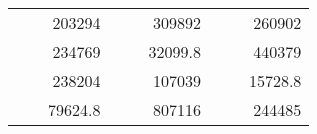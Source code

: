 \begin{table}[]
\begin{tabular}{|ccrccrccc}
\rowcolor[HTML]{DAE8FC} 
\multicolumn{1}{|c|}{\cellcolor[HTML]{FFFFC7}}                                & \multicolumn{1}{c|}{\cellcolor[HTML]{DAE8FC}}                      & \multicolumn{1}{r|}{\cellcolor[HTML]{DAE8FC}203294}    & \multicolumn{1}{c|}{\cellcolor[HTML]{FFFFC7}}                                & \multicolumn{1}{c|}{\cellcolor[HTML]{DAE8FC}}                       & \multicolumn{1}{r|}{\cellcolor[HTML]{DAE8FC}309892}    & \multicolumn{1}{c|}{\cellcolor[HTML]{FFFFC7}}                                & \multicolumn{1}{c|}{\cellcolor[HTML]{DAE8FC}}                      & \multicolumn{1}{r|}{\cellcolor[HTML]{DAE8FC}260902}    \\ \cline{3-3} \cline{6-6} \cline{9-9} 
\multicolumn{1}{|c|}{\cellcolor[HTML]{FFFFC7}}                                & \multicolumn{1}{c|}{\cellcolor[HTML]{DAE8FC}}                      & \multicolumn{1}{r|}{\cellcolor[HTML]{DDFDFF}234769}    & \multicolumn{1}{c|}{\cellcolor[HTML]{FFFFC7}}                                & \multicolumn{1}{c|}{\cellcolor[HTML]{DAE8FC}}                       & \multicolumn{1}{r|}{\cellcolor[HTML]{DDFDFF}32099.8}   & \multicolumn{1}{c|}{\cellcolor[HTML]{FFFFC7}}                                & \multicolumn{1}{c|}{\cellcolor[HTML]{DAE8FC}}                      & \multicolumn{1}{r|}{\cellcolor[HTML]{DDFDFF}440379}    \\ \cline{3-3} \cline{6-6} \cline{9-9} 
\rowcolor[HTML]{DAE8FC} 
\multicolumn{1}{|c|}{\cellcolor[HTML]{FFFFC7}}                                & \multicolumn{1}{c|}{\cellcolor[HTML]{DAE8FC}}                      & \multicolumn{1}{r|}{\cellcolor[HTML]{DAE8FC}238204}    & \multicolumn{1}{c|}{\cellcolor[HTML]{FFFFC7}}                                & \multicolumn{1}{c|}{\cellcolor[HTML]{DAE8FC}}                       & \multicolumn{1}{r|}{\cellcolor[HTML]{DAE8FC}107039}    & \multicolumn{1}{c|}{\cellcolor[HTML]{FFFFC7}}                                & \multicolumn{1}{c|}{\cellcolor[HTML]{DAE8FC}}                      & \multicolumn{1}{r|}{\cellcolor[HTML]{DAE8FC}15728.8}   \\ \cline{3-3} \cline{6-6} \cline{9-9} 
\multicolumn{1}{|c|}{\cellcolor[HTML]{FFFFC7}}                                & \multicolumn{1}{c|}{\cellcolor[HTML]{DAE8FC}}                      & \multicolumn{1}{r|}{\cellcolor[HTML]{DDFDFF}79624.8}   & \multicolumn{1}{c|}{\cellcolor[HTML]{FFFFC7}}                                & \multicolumn{1}{c|}{\cellcolor[HTML]{DAE8FC}}                       & \multicolumn{1}{r|}{\cellcolor[HTML]{DDFDFF}807116}    & \multicolumn{1}{c|}{\cellcolor[HTML]{FFFFC7}}                                & \multicolumn{1}{c|}{\cellcolor[HTML]{DAE8FC}}                      & \multicolumn{1}{r|}{\cellcolor[HTML]{DDFDFF}244485}    \\ \cline{3-3} \cline{6-6} \cline{9-9} 

\end{tabular}
\end{table}
